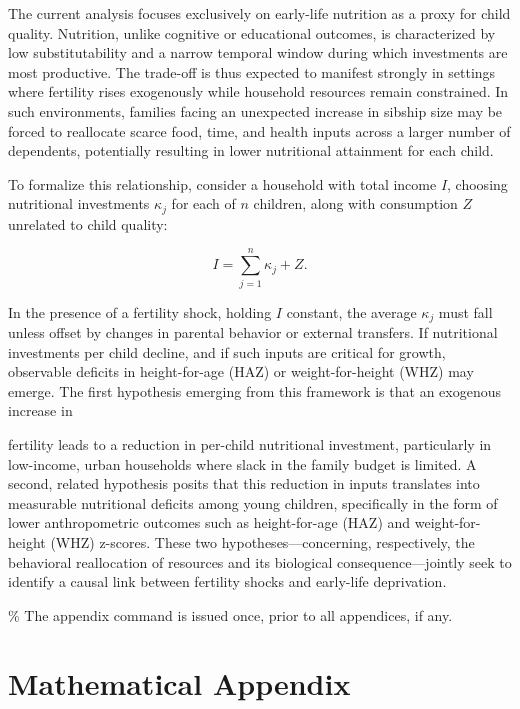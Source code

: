 \documentclass[]{AEA}
\begin{document}
The current analysis focuses exclusively on early-life nutrition as a
proxy for child quality. Nutrition, unlike cognitive or educational
outcomes, is characterized by low substitutability and a narrow temporal
window during which investments are most productive. The trade-off is
thus expected to manifest strongly in settings where fertility rises
exogenously while household resources remain constrained. In such
environments, families facing an unexpected increase in sibship size may
be forced to reallocate scarce food, time, and health inputs across a
larger number of dependents, potentially resulting in lower nutritional
attainment for each child.

To formalize this relationship, consider a household with total income
\(I\), choosing nutritional investments \(\kappa_j\) for each of \(n\)
children, along with consumption \(Z\) unrelated to child quality:

\[
I = \sum_{j=1}^{n} \kappa_j + Z.
\]

In the presence of a fertility shock, holding \(I\) constant, the
average \(\kappa_j\) must fall unless offset by changes in parental
behavior or external transfers. If nutritional investments per child
decline, and if such inputs are critical for growth, observable deficits
in height-for-age (HAZ) or weight-for-height (WHZ) may emerge. The first
hypothesis emerging from this framework is that an exogenous increase in

fertility leads to a reduction in per-child nutritional investment,
particularly in low-income, urban households where slack in the family
budget is limited. A second, related hypothesis posits that this
reduction in inputs translates into measurable nutritional deficits
among young children, specifically in the form of lower anthropometric
outcomes such as height-for-age (HAZ) and weight-for-height (WHZ)
z-scores. These two hypotheses---concerning, respectively, the
behavioral reallocation of resources and its biological
consequence---jointly seek to identify a causal link between fertility
shocks and early-life deprivation.




\% The appendix command is issued once, prior to all appendices, if any.
\appendix

\section{Mathematical Appendix}
\end{document}

